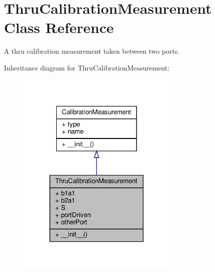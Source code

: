 \hypertarget{classSignalIntegrity_1_1Measurement_1_1Calibration_1_1CalibrationMeasurements_1_1ThruCalibrationMeasurement}{}\section{Thru\+Calibration\+Measurement Class Reference}
\label{classSignalIntegrity_1_1Measurement_1_1Calibration_1_1CalibrationMeasurements_1_1ThruCalibrationMeasurement}


A thru calibration measurement taken between two ports.  




Inheritance diagram for Thru\+Calibration\+Measurement\+:
\nopagebreak
\begin{figure}[H]
\begin{center}
\leavevmode
\includegraphics[width=222pt]{classSignalIntegrity_1_1Measurement_1_1Calibration_1_1CalibrationMeasurements_1_1ThruCalibrationMeasurement__inherit__graph}
\end{center}
\end{figure}


